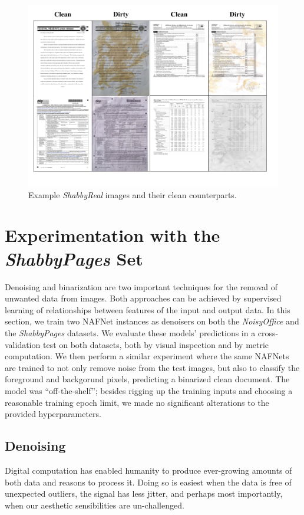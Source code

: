 \documentclass[runningheads]{llncs}
\begin{document}
\begin{figure}
\centering
\includegraphics[width=0.98\columnwidth, frame]{figures/shabbyreal_figure1.png}
\caption{Example \emph{ShabbyReal} images and their clean counterparts.}
\label{fig:shabbyreal_sample}
\end{figure}

\section{Experimentation with the \emph{ShabbyPages} Set}
Denoising and binarization are two important techniques for the removal of unwanted data from images.
Both approaches can be achieved by supervised learning of relationships between features of the input and output data.
In this section, we train two NAFNet \cite{ref_nafnet} instances as denoisers on both the \emph{NoisyOffice} and the \emph{ShabbyPages} datasets. We evaluate these models' predictions in a cross-validation test on both datasets, both by visual inspection and by metric computation.
We then perform a similar experiment where the same NAFNets are trained to not only remove noise from the test images, but also to classify the foreground and backgorund pixels, predicting a binarized clean document.
The model was ``off-the-shelf''; besides rigging up the training inputs and choosing a reasonable training epoch limit, we made no significant alterations to the provided hyperparameters.

\subsection{Denoising}
Digital computation has enabled humanity to produce ever-growing amounts of both data and reasons to process it.
Doing so is easiest when the data is free of unexpected outliers, the signal has less jitter, and perhaps most importantly, when our aesthetic sensibilities are un-challenged.
\end{document}
